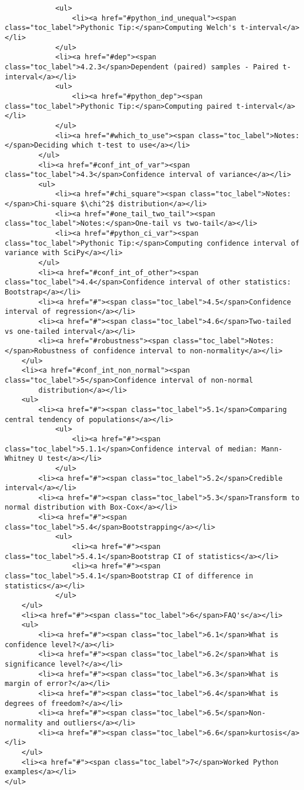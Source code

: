 \documentclass[11pt]{article}
\begin{document}
\begin{verbatim}
            <ul>
                <li><a href="#python_ind_unequal"><span class="toc_label">Pythonic Tip:</span>Computing Welch's t-interval</a></li>
            </ul>
            <li><a href="#dep"><span class="toc_label">4.2.3</span>Dependent (paired) samples - Paired t-interval</a></li>
            <ul>
                <li><a href="#python_dep"><span class="toc_label">Pythonic Tip:</span>Computing paired t-interval</a></li>
            </ul>
            <li><a href="#which_to_use"><span class="toc_label">Notes:</span>Deciding which t-test to use</a></li>
        </ul>
        <li><a href="#conf_int_of_var"><span class="toc_label">4.3</span>Confidence interval of variance</a></li>
        <ul>
            <li><a href="#chi_square"><span class="toc_label">Notes:</span>Chi-square $\chi^2$ distribution</a></li>
            <li><a href="#one_tail_two_tail"><span class="toc_label">Notes:</span>One-tail vs two-tail</a></li>
            <li><a href="#python_ci_var"><span class="toc_label">Pythonic Tip:</span>Computing confidence interval of variance with SciPy</a></li>
        </ul>
        <li><a href="#conf_int_of_other"><span class="toc_label">4.4</span>Confidence interval of other statistics: Bootstrap</a></li>
        <li><a href="#"><span class="toc_label">4.5</span>Confidence interval of regression</a></li>
        <li><a href="#"><span class="toc_label">4.6</span>Two-tailed vs one-tailed interval</a></li>
        <li><a href="#robustness"><span class="toc_label">Notes:</span>Robustness of confidence interval to non-normality</a></li>
    </ul>
    <li><a href="#conf_int_non_normal"><span class="toc_label">5</span>Confidence interval of non-normal
        distribution</a></li>
    <ul>
        <li><a href="#"><span class="toc_label">5.1</span>Comparing central tendency of populations</a></li>
            <ul>
                <li><a href="#"><span class="toc_label">5.1.1</span>Confidence interval of median: Mann-Whitney U test</a></li>
            </ul>
        <li><a href="#"><span class="toc_label">5.2</span>Credible interval</a></li>
        <li><a href="#"><span class="toc_label">5.3</span>Transform to normal distribution with Box-Cox</a></li>
        <li><a href="#"><span class="toc_label">5.4</span>Bootstrapping</a></li>
            <ul>
                <li><a href="#"><span class="toc_label">5.4.1</span>Bootstrap CI of statistics</a></li>
                <li><a href="#"><span class="toc_label">5.4.1</span>Bootstrap CI of difference in statistics</a></li>
            </ul>
    </ul>
    <li><a href="#"><span class="toc_label">6</span>FAQ's</a></li>
    <ul>
        <li><a href="#"><span class="toc_label">6.1</span>What is confidence level?</a></li>
        <li><a href="#"><span class="toc_label">6.2</span>What is significance level?</a></li>
        <li><a href="#"><span class="toc_label">6.3</span>What is margin of error?</a></li>
        <li><a href="#"><span class="toc_label">6.4</span>What is degrees of freedom?</a></li>
        <li><a href="#"><span class="toc_label">6.5</span>Non-normality and outliers</a></li>
        <li><a href="#"><span class="toc_label">6.6</span>kurtosis</a></li>
    </ul>
    <li><a href="#"><span class="toc_label">7</span>Worked Python examples</a></li>
</ul>
\end{verbatim}
\end{document}
